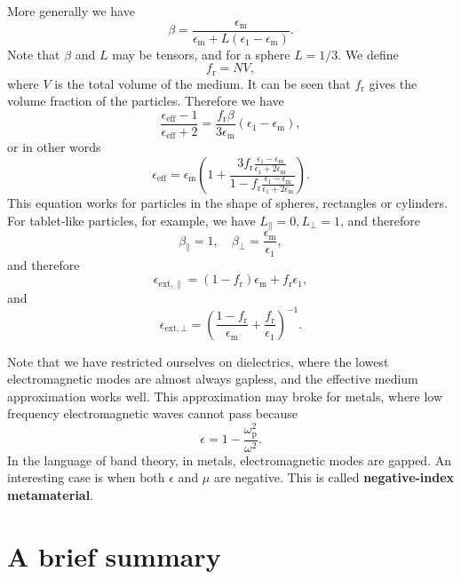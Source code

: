 \documentclass[hyperref, a4paper]{article}
\newcommand*{\concept}[1]{{\textbf{#1}}}
\begin{document}
More generally we have 
\begin{equation}
    \beta = \frac{\epsilon_\text{m}}{\epsilon_\text{m} + L (\epsilon_1 - \epsilon_\text{m})}.
\end{equation}
Note that $\beta$ and $L$ may be tensors, and for a sphere $L = 1/3$. We define 
\begin{equation}
    f_\text{r} = NV,
\end{equation}
where $V$ is the total volume of the medium. It can be seen that $f_\text{r}$ gives the volume fraction of the 
particles. Therefore we have 
\begin{equation}
    \frac{\epsilon_\text{eff} - 1}{\epsilon_\text{eff} + 2} = \frac{f_\text{r} \beta}{3 \epsilon_\text{m}} (\epsilon_1 - \epsilon_\text{m}),
\end{equation} 
or in other words 
\begin{equation}
    \epsilon_\text{eff} = \epsilon_\text{m} \left( 1 + \frac{3 f_\text{r} \frac{\epsilon_1 - \epsilon_\text{m}}{\epsilon_1 + 2 \epsilon_\text{m}}}{1 - f_\text{r} \frac{\epsilon_1 - \epsilon_\text{m}}{\epsilon_1 + 2 \epsilon_\text{m}}} \right).
\end{equation}
This equation works for particles in the shape of spheres, rectangles or cylinders.
For tablet-like particles, for example, we have $L_\parallel = 0, L_\bot = 1$, and therefore 
\[
    \beta_\parallel = 1, \quad \beta_\bot = \frac{\epsilon_\text{m}}{\epsilon_1},
\] 
and therefore 
\begin{equation}
    \epsilon_{\text{ext}, \parallel} = (1 - f_\text{r}) \epsilon_\text{m} + f_\text{r} \epsilon_1,
\end{equation}
and
\begin{equation}
    \epsilon_{\text{ext}, \bot} = \left( \frac{1 - f_\text{r}}{\epsilon_\text{m}} + \frac{f_\text{r}}{\epsilon_1} \right)^{-1}.
\end{equation}

Note that we have restricted ourselves on dielectrics, where the lowest electromagnetic modes are almost 
always gapless, and the effective medium approximation works well. This approximation may broke for metals,
where low frequency electromagnetic waves cannot pass because 
\[
    \epsilon = 1 - \frac{\omega_\text{p}^2}{\omega^2}.
\]
In the language of band theory, in metals, electromagnetic modes are gapped. An interesting case is 
when both $\epsilon$ and $\mu$ are negative. This is called \concept{negative-index metamaterial}.

\section{A brief summary}
\end{document}
